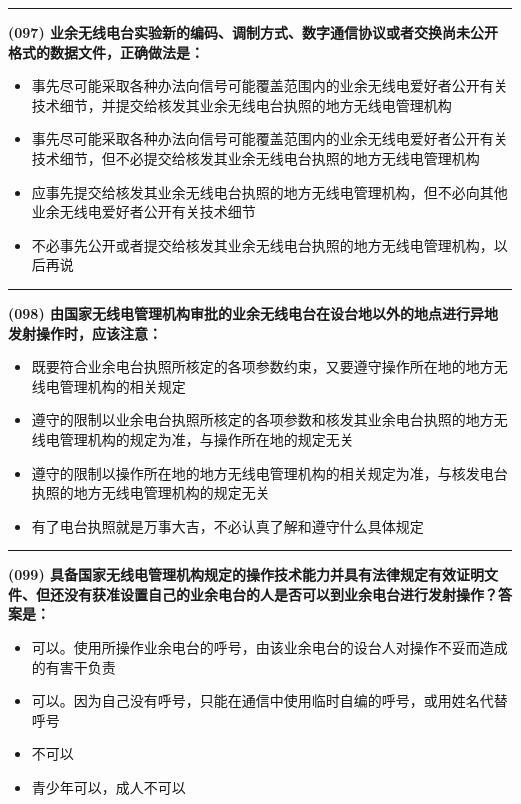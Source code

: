 \documentclass[twocolumn]{ctexart}  %
\begin{document}
\noindent\rule{0.5\textwidth}{1pt}
\heiti \textbf{(097) 业余无线电台实验新的编码、调制方式、数字通信协议或者交换尚未公开格式的数据文件，正确做法是：} \songti {\color{gray} [LK0061] }
\begin{itemize}
	\item  事先尽可能采取各种办法向信号可能覆盖范围内的业余无线电爱好者公开有关技术细节，并提交给核发其业余无线电台执照的地方无线电管理机构
	\item  事先尽可能采取各种办法向信号可能覆盖范围内的业余无线电爱好者公开有关技术细节，但不必提交给核发其业余无线电台执照的地方无线电管理机构
	\item  应事先提交给核发其业余无线电台执照的地方无线电管理机构，但不必向其他业余无线电爱好者公开有关技术细节
	\item  不必事先公开或者提交给核发其业余无线电台执照的地方无线电管理机构，以后再说
\end{itemize}


\noindent\rule{0.5\textwidth}{1pt}
\heiti \textbf{(098) 由国家无线电管理机构审批的业余无线电台在设台地以外的地点进行异地发射操作时，应该注意：} \songti {\color{gray} [LK0062] }
\begin{itemize}
	\item  既要符合业余电台执照所核定的各项参数约束，又要遵守操作所在地的地方无线电管理机构的相关规定
	\item  遵守的限制以业余电台执照所核定的各项参数和核发其业余电台执照的地方无线电管理机构的规定为准，与操作所在地的规定无关
	\item  遵守的限制以操作所在地的地方无线电管理机构的相关规定为准，与核发电台执照的地方无线电管理机构的规定无关
	\item  有了电台执照就是万事大吉，不必认真了解和遵守什么具体规定
\end{itemize}


\noindent\rule{0.5\textwidth}{1pt}
\heiti \textbf{(099) 具备国家无线电管理机构规定的操作技术能力并具有法律规定有效证明文件、但还没有获准设置自己的业余电台的人是否可以到业余电台进行发射操作？答案是：} \songti {\color{gray} [LK0063] }
\begin{itemize}
	\item  可以。使用所操作业余电台的呼号，由该业余电台的设台人对操作不妥而造成的有害干负责
	\item  可以。因为自己没有呼号，只能在通信中使用临时自编的呼号，或用姓名代替呼号
	\item  不可以
	\item  青少年可以，成人不可以
\end{itemize}
\end{document}
